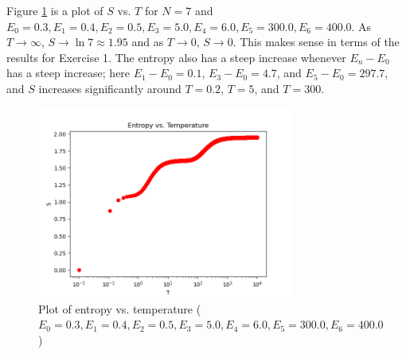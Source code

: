 \documentclass{article}
\begin{document}
\problem
Figure \ref{fig:fig2} is a plot of $S$ vs. $T$ for $N = 7$ and $E_0 = 0.3, E_1 = 0.4, E_2 = 0.5, E_3 = 5.0, E_4 = 6.0, E_5 = 300.0, E_6 = 400.0$. As $T \to \infty$, $S \to \ln 7 \approx 1.95$ and as $T \to 0$, $S \to 0$. This makes sense in terms of the results for Exercise 1. The entropy also has a steep increase whenever $E_n - E_0$ has a steep increase; here $E_1 - E_0 = 0.1$, $E_3 - E_0 = 4.7$, and $E_5 - E_0 = 297.7$, and $S$ increases significantly around $T = 0.2$, $T = 5$, and $T = 300$.
\begin{figure}[!htb]
    \centering
    \includegraphics[width=0.75\textwidth]{../code/phy112l_lab2/2-5.png}
    \caption{Plot of entropy vs. temperature ($E_0 = 0.3, E_1 = 0.4, E_2 = 0.5, E_3 = 5.0, E_4 = 6.0, E_5 = 300.0, E_6 = 400.0$)}
    \label{fig:fig2}
\end{figure}

\clearpage
\end{document}
